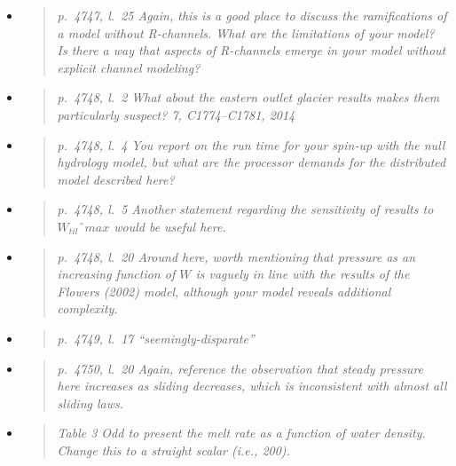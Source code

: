 \documentclass[11pt,reqno]{amsart}
\newcommand{\reply}[2]{
\medskip\medskip
\item  \begin{quote}
\emph{#1}
\end{quote}

\medskip
\noindent #2}
\begin{document}
\begin{itemize}
\reply{p.~4747, l.~25 Again, this is a good place to discuss the ramifications of a model without
R-channels. What are the limitations of your model? Is there a way that aspects of R-channels emerge in your model without explicit channel modeling?}
{}

\reply{p.~4748, l.~2 What about the eastern outlet glacier results makes them particularly
suspect? 7, C1774--C1781, 2014}
{}

\reply{p.~4748, l.~4 You report on the run time for your spin-up with the null hydrology model,
but what are the processor demands for the distributed model described here?}
{}

\reply{p.~4748, l.~5 Another statement regarding the sensitivity of results to $W_{til}ˆ{max}$ would
be useful here.}
{}

\reply{p.~4748, l.~20 Around here, worth mentioning that pressure as an increasing function of
$W$ is vaguely in line with the results of the Flowers (2002) model, although your model
reveals additional complexity.}
{}

\reply{p.~4749, l.~17 ``seemingly-disparate''}
{}

\reply{p.~4750, l.~20 Again, reference the observation that steady pressure here increases as
sliding decreases, which is inconsistent with almost all sliding laws.}
{}

\reply{Table 3 Odd to present the melt rate as a function of water density. Change this to a
straight scalar (i.e., 200).}
{}
\end{itemize}
\end{document}
